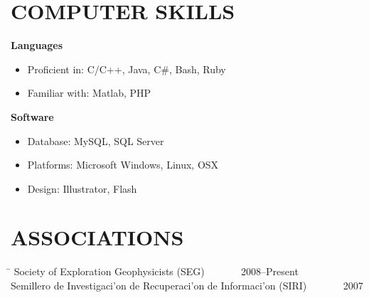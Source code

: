 \documentclass{res}
\begin{document}
\begin{resume}
\section{COMPUTER SKILLS}
	\vspace{0.05 in}	

    \textbf{Languages}\\
	\vspace{-0.1 in}	
    \begin{itemize}
    	\item Proficient in: C/C++, Java, C\#, Bash, Ruby
    	\item Familiar with: Matlab, PHP
    \end{itemize}

	\textbf{Software}
	\begin{itemize}
		\item Database: MySQL, SQL Server
		\item Platforms: Microsoft Windows, Linux, OSX
		\item Design: Illustrator, Flash
	\end{itemize} 

\section{ASSOCIATIONS}
    \vspace{0.05 in}    
    \begin{tabbing}
    \hspace{4.9in}\= \kill %
    Society of Exploration Geophysicists (SEG) \> ~~~~~~ 2008--Present\\
    Semillero de Investigaci\a'on de Recuperaci\a'on de Informaci\a'on (SIRI) \> ~~~~~~ 2007\\
    \end{tabbing}\vspace{-15pt}


% 


\end{resume}
\end{document}
